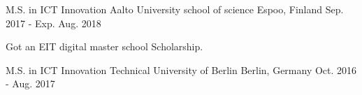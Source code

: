 

\begin{cventries}

  \cventry
    {M.S. in ICT Innovation} %
    {Aalto University school of science} %
    {Espoo, Finland} %
    {Sep. 2017 - Exp. Aug. 2018} %
    {
      \begin{cvitems} %
        \item {Got an EIT digital master school Scholarship.}
      \end{cvitems}
    }
    
  \cventry
    {M.S. in ICT Innovation} %
    {Technical University of Berlin} %
    {Berlin, Germany} %
    {Oct. 2016 - Aug. 2017} %
    {}
\end{cventries}
